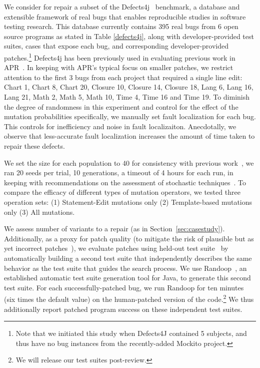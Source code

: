 \documentclass[conference]{IEEEtran}
\begin{document}
We consider for repair a subset of the Defects4j~\cite{just14}
benchmark, a database and extensible 
framework of real bugs that enables reproducible studies in software testing 
research. This database currently contains 395 real bugs from 6
open source programs as stated in Table \ref{defects4j}, along with developer-provided test suites, cases that
expose each bug,  and
corresponding developer-provided patches.\footnote{Note that we initiated this study when Defects4J
  contained 5 subjects, and thus have no bug instances from the recently-added
  Mockito project.} Defects4j has been previously used
in evaluating previous work in APR~\cite{Durieux15}.
In keeping with APR's typical focus on smaller patches, we
restrict attention to the first 3 bugs from each project that required a 
single line edit: Chart 1, 
Chart 8, Chart 20, Closure 10, Closure 14, Closure 18, Lang 6, Lang 16, Lang 21, 
Math 2, Math 5, Math 10, Time 4, Time 16 and Time 19.
To diminish the degree of randomness in this experiment and control for the
effect of the mutation probabilities specifically,  we manually
set fault localization for each bug.  This controls for inefficiency and noise
in fault localizaiton. Anecdotally, we observe that less-accurate fault localization increases the amount of
time taken to repair these defects. 

We set the size for each population to 40 for consistency with 
previous work~\cite{legoues12,kim2013}, we ran 20
seeds per trial, 10 generations, a timeout of 4 hours for each run, in keeping with 
recommendations on the assessment of stochastic techniques~\cite{arcuri11}.
To compare the efficacy of different types of mutation operators,
we tested three operation sets: (1) Statement-Edit mutations only (2) Template-based mutations 
only (3) All mutations.  

We assess number of variants to a repair (as in
Section~\ref{sec:casestudy}).  Additionally, as a proxy for patch quality (to
mitigate the risk of plausible but as yet incorrect patches~\cite{Qi15}), we
evaluate patches using held-out test suite~\cite{legoues2012,Smith15} by automatically building a second
test suite that independently describes the same behavior as the test suite that
guides the search process. We use Randoop~\cite{pacheco07}, an established
automatic test suite generation tool for Java, to generate this second test
suite. 
For each successfully-patched bug, we 
run Randoop for ten minutes (six times the default value) on the human-patched
version of the code.\footnote{We will release our test suites post-review.}  We
thus additionally report patched program success on these independent test
suites. 
\end{document}
